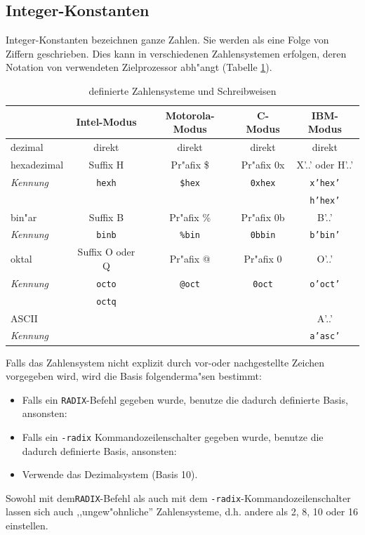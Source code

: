 \documentclass[12pt,a4paper,twoside]{report}
\newcommand{\ii}[1]{{\it #1}}
\newcommand{\tty}[1]{{\tt #1}}
\begin{document}
\subsection{Integer-Konstanten}
\label{SectIntConsts}

Integer-Konstanten bezeichnen ganze Zahlen.  Sie werden als eine
Folge von Ziffern geschrieben.  Dies kann in verschiedenen
Zahlensystemen erfolgen, deren Notation von verwendeten
Zielprozessor abh"angt (Tabelle
\ref{TabSystems}).
\par
\begin{table}[htbp]
\begin{center}\begin{tabular}{|l|c|c|c|c|}
\hline
            & Intel-Modus     & Motorola-Modus & C-Modus  & IBM-Modus  \\
\hline
\hline
dezimal     & direkt          & direkt      & direkt      & direkt \\
hexadezimal & Suffix H        & Pr"afix \$  & Pr"afix 0x  & X'..' oder H'..' \\
\ii{Kennung}& \tty{hexh}      & \tty{\$hex} & \tty{0xhex} & \tty{x'hex'} \\
            &                 &             &             & \tty{h'hex'} \\
bin"ar      & Suffix B        & Pr"afix \%  & Pr"afix 0b  & B'..' \\
\ii{Kennung}& \tty{binb}      & \tty{\%bin} & \tty{0bbin} & \tty{b'bin'} \\
oktal       & Suffix O oder Q & Pr"afix @   & Pr"afix 0   & O'..' \\
\ii{Kennung}& \tty{octo}      & \tty{@oct}  & \tty{0oct}  & \tty{o'oct'} \\  
            & \tty{octq}      &             &             & \\
ASCII       &                 &             &             & A'..' \\
\ii{Kennung}&                 &             &             & \tty{a'asc'} \\
\hline
\end{tabular}\end{center}
\caption{definierte Zahlensysteme und Schreibweisen\label{TabSystems}}
\end{table}
Falls das Zahlensystem nicht explizit durch vor-oder nachgestellte Zeichen
vorgegeben wird, wird die Basis folgenderma"sen bestimmt:
\begin{itemize}
\item{Falls ein {\tt RADIX}-Befehl gegeben wurde, benutze die dadurch
      definierte Basis, ansonsten:}
\item{Falls ein {\tt -radix} Kommandozeilenschalter gegeben wurde,
      benutze die dadurch definierte Basis, ansonsten:}
\item{Verwende das Dezimalsystem (Basis 10).}
\end{itemize}
Sowohl mit dem{\tt RADIX}-Befehl als auch mit dem {\tt -radix}-Kommandozeilenschalter
lassen sich auch ,,ungew"ohnliche'' Zahlensysteme, d.h. andere als 2, 8,
10 oder 16 einstellen.
\end{document}
